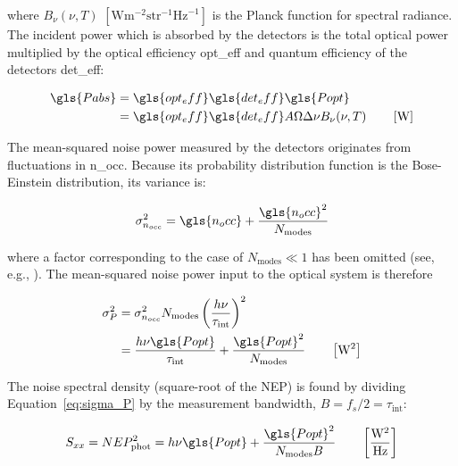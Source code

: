 where $B_{\nu}(\nu, T)$ $\left[ \mathrm{W}\mathrm{m}^{-2}\mathrm{ str }^{-1}\mathrm{Hz}^{-1} \right]$ is the Planck function for spectral radiance. The incident power which is absorbed by the detectors is the total optical power multiplied by the optical efficiency \gls{opt_eff} and quantum efficiency of the detectors \gls{det_eff}:

\begin{equation}\label{eq:P_abs}
  \begin{aligned}
  \gls{Pabs} &= \gls{opt_eff}\gls{det_eff}\gls{Popt} \\
          &= \gls{opt_eff}\gls{det_eff} A\Omega\Delta\nu B_{\nu}(\nu, T) \qquad \left[ \mathrm{W} \right]
  \end{aligned}
\end{equation}

The mean-squared noise power measured by the detectors originates from fluctuations in \gls{n_occ}. Because its probability distribution function is the Bose-Einstein distribution, its variance is:

\begin{equation}
  \sigma^{2}_{n_{occ}} = \gls{n_occ} + \frac{ \gls{n_occ}^{2} }{N_{\mathrm{modes}}}
\end{equation}

where a factor corresponding to the case of $N_{\mathrm{modes}} \ll 1$ has been omitted (see, e.g., \citet{fox2006quantum,rowe2015passive}). The mean-squared noise power input to the optical system is therefore

\begin{equation}\label{eq:sigma_P}
  \begin{aligned}
  \sigma^{2}_{P} &= \sigma^{2}_{n_{occ}}N_{\mathrm{modes}}\left( \frac{h\nu}{\tau_{\mathrm{int}}} \right)^{2} \\
                 &= \frac{h\nu \gls{Popt}}{\tau_{\mathrm{int}}} + \frac{\gls{Popt}^{2}}{N_{\mathrm{modes}}} \qquad \left[ \mathrm{W}^{2} \right]
  \end{aligned}
\end{equation}

The noise spectral density (square-root of the NEP) is found by dividing Equation~\ref{eq:sigma_P} by the measurement bandwidth, $B = f_{s}/2 = \tau_{\mathrm{int}}$:

\begin{equation}\label{eq:Sxx_Popt}
  S_{xx} =  NEP_{\mathrm{phot}}^{2} = h\nu \gls{Popt} + \frac{\gls{Popt}^{2}}{N_{\mathrm{modes}}B} \qquad \left[ \frac{\mathrm{W}^{2}}{\mathrm{Hz}} \right]
\end{equation}

